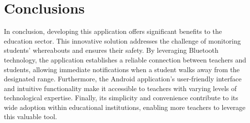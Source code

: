 \section{Conclusions}
In conclusion, developing this application offers significant benefits to the education sector. This innovative solution addresses the challenge of monitoring students' whereabouts and ensures their safety. By leveraging Bluetooth technology, the application establishes a reliable connection between teachers and students, allowing immediate notifications when a student walks away from the designated range. Furthermore, the Android application's user-friendly interface and intuitive functionality make it accessible to teachers with varying levels of technological expertise. Finally, its simplicity and convenience contribute to its wide adoption within educational institutions, enabling more teachers to leverage this valuable tool.